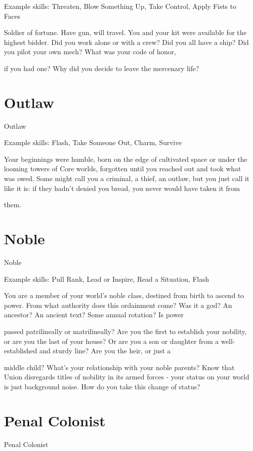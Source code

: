 Example skills: Threaten, Blow Something Up, Take Control, Apply Fists to Faces  

Soldier of fortune. Have gun, will travel. You and your kit were available for the highest bidder. Did you work  
alone or with a crew? Did you all have a ship? Did you pilot your own mech? What was your code of honor,  

if you had one? Why did you decide to leave the mercenary life?  
\section{Outlaw}
                                                       Outlaw  

Example skills: Flash, Take Someone Out, Charm, Survive  

Your beginnings were humble, born on the edge of cultivated space or under the looming towers of Core  
worlds, forgotten until you reached out and took what was owed. Some might call you a criminal, a thief, an  
outlaw, but you just call it like it is: if they hadn’t denied you bread, you never would have taken it from  

them.   
\section{Noble}
                                                        Noble  

Example skills: Pull Rank, Lead or Inspire, Read a Situation, Flash  

You are a member of your world’s noble class, destined from birth to ascend to power. From what authority  
does this ordainment come? Was it a god? An ancestor? An ancient text? Some annual rotation? Is power  

passed patrilineally or matrilineally? Are you the first to establish your nobility, or are you the last of your  
house? Or are you a son or daughter from a well-established and sturdy line? Are you the heir, or just a  

middle child? What’s your relationship with your noble parents? Know that Union disregards titles of  
nobility in its armed forces - your status on your world is just background noise. How do you take this  
change of status?  
 \section{Penal Colonist}

                                                 Penal Colonist  

